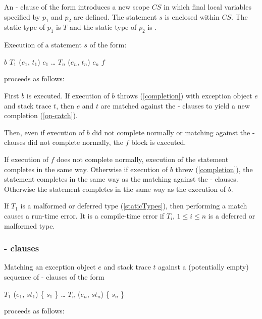 \documentclass[makeidx]{article}
\begin{document}
{\LMHash{}%
An \ON{}-\CATCH{} clause of the form  introduces a new scope $CS$ in which final local variables specified by $p_1$ and $p_2$ are defined.
The statement $s$ is enclosed within $CS$.
The static type of $p_1$ is $T$ and the static type of $p_2$ is .

\LMHash{}%
Execution of a \TRY{} statement $s$ of the form:

\begin{normativeDartCode}
\TRY{} $b$
\ON{} $T_1$ \CATCH{} ($e_1$, $t_1$) $c_1$
\ldots{}
\ON{} $T_n$ \CATCH{} ($e_n$, $t_n$) $c_n$
\FINALLY{} $f$
\end{normativeDartCode}
proceeds as follows:

\LMHash{}%
First $b$ is executed.
If execution of $b$ throws (\ref{completion}) with exception object $e$ and stack trace $t$, then $e$ and $t$ are matched against the \ON{}-\CATCH{} clauses to yield a new completion (\ref{on-catch}).

Then, even if execution of $b$ did not complete normally or matching against the \ON{}-\CATCH{} clauses did not complete normally, the $f$ block is executed.

If execution of $f$ does not complete normally,
execution of the \TRY{} statement completes in the same way.
Otherwise if execution of $b$ threw (\ref{completion}), the \TRY{} statement completes in the same way as the matching against the \ON{}-\CATCH{} clauses.
Otherwise the \TRY{} statement completes in the same way as the execution of $b$.

\LMHash{}%
If $T_1$ is a malformed or deferred type (\ref{staticTypes}), then performing a match causes a run-time error.
It is a compile-time error if $T_i$, $1 \le i \le n$ is a deferred or malformed type.


\subsubsection{\ON{}-\CATCH{} clauses}

\LMHash{}%
Matching an exception object $e$ and stack trace $t$ against a (potentially empty) sequence of \ON{}-\CATCH{} clauses of the form

\begin{normativeDartCode}
\ON{} $T_1$ \CATCH{} ($e_1$, $st_1$) \{ $s_1$ \}
\ldots
\ON{} $T_n$ \CATCH{} ($e_n$, $st_n$) \{ $s_n$ \}
\end{normativeDartCode}
proceeds as follows:

}
\end{document}
